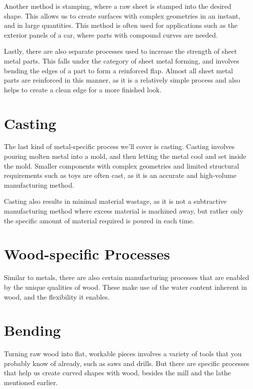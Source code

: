 Another method is stamping, where a raw sheet is stamped into the desired shape. This allows us to create surfaces with complex geometries in an instant, and in large quantities. This method is often used for applications such as the exterior panels of a car, where parts with compound curves are needed.


Lastly, there are also separate processes used to increase the strength of sheet metal parts. This falls under the category of sheet metal forming, and involves bending the edges of a part to form a reinforced flap. Almost all sheet metal parts are reinforced in this manner, as it is a relatively simple process and also helps to create a clean edge for a more finished look.

\section{Casting}

The last kind of metal-specific process we’ll cover is casting. Casting involves pouring molten metal into a mold, and then letting the metal cool and set inside the mold. Smaller components with complex geometries and limited structural requirements such as toys are often cast, as it is an accurate and high-volume manufacturing method.

Casting also results in minimal material wastage, as it is not a subtractive manufacturing method where excess material is machined away, but rather only the specific amount of material required is poured in each time.

\section{Wood-specific Processes}

Similar to metals, there are also certain manufacturing processes that are enabled by the unique qualities of wood. These make use of the water content inherent in wood, and the flexibility it enables.

\section{Bending}

Turning raw wood into flat, workable pieces involves a variety of tools that you probably know of already, such as saws and drills. But there are specific processes that help us create curved shapes with wood, besides the mill and the lathe mentioned earlier.

